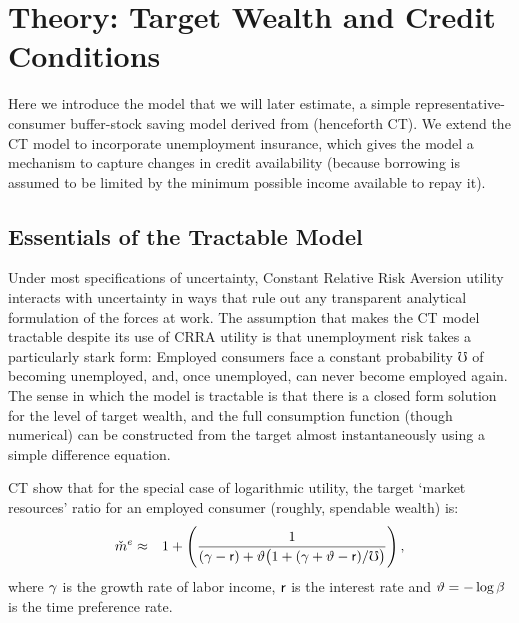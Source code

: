 \documentclass[titlepage]{\econtex}
\begin{document}
\hypertarget{ssTractableBS}{}

\section{Theory: Target Wealth and Credit Conditions} \label{ssTractableBS}

Here we introduce the model that we will later estimate, a simple representative-consumer buffer-stock saving model derived from \cite{ctDiscrete} (henceforth CT).  We extend the CT model to incorporate unemployment insurance, which gives the model a mechanism to capture changes in credit availability (because borrowing is assumed to be limited by the minimum possible income available to repay it).

\subsection{Essentials of the Tractable Model}

Under most specifications of uncertainty, Constant Relative Risk Aversion utility interacts with uncertainty in ways that rule out any transparent analytical formulation of the forces at work. The assumption that makes the CT model tractable despite its use of CRRA utility is that unemployment risk takes a particularly stark form: Employed consumers face a constant probability $\mho$ of becoming unemployed, and, once unemployed, can never become employed again.  The sense in which the model is tractable is that there is a closed form solution for the level of target wealth, and the full consumption function (though numerical) can be constructed from the target almost instantaneously using a simple difference equation.  %

CT show that for the special case of logarithmic utility, the target `market resources' ratio for an employed consumer (roughly, spendable wealth) is:
\begin{eqnarray}
  \check{m}^{e}
  & \approx &
  1 + \left(\frac{1}{(\gamma-\mathsf{r})+\vartheta\big(1+(\gamma+\vartheta-\mathsf{r})/\mho\big)}\right),
\label{eq:mTargetLogCase}
\end{eqnarray}
where $\gamma$ is the growth rate of labor income, $\mathsf{r}$ is the interest rate and $\vartheta=-\log \beta$ is the time preference rate.
\end{document}
